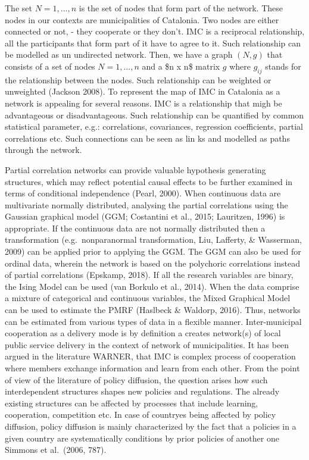 \documentclass[
  letterpaper,
  DIV=11,
  numbers=noendperiod]{scrartcl}
\begin{document}
The set \(N = {1, ..., n}\) is the set of nodes that form part of the
network. These nodes in our contexts are municipalities of Catalonia.
Two nodes are either connected or not, - they cooperate or they don't.
IMC is a reciprocal relationship, all the participants that form part of
it have to agree to it. Such relationship can be modelled as un
undirected network. Then, we have a graph \((N, g)\) that consists of a
set of nodes \(N = {1, ..., n}\) and a \$n x n\$ matrix \(g\) where
\(g_{ij}\) stands for the relationship between the nodes. Such
relationship can be weighted or unweighted (Jackson 2008). To represent
the map of IMC in Catalonia as a network is appealing for several
reasons. IMC is a relationship that migh be advantageous or
disadvantageous. Such relationship can be quantified by common
statistical parameter, e.g.: correlations, covariances, regression
coefficients, partial correlations etc. Such connections can be seen as
lin ks and modelled as paths through the network.

Partial correlation networks can provide valuable hypothesis generating
structures, which may reflect potential causal effects to be further
examined in terms of conditional independence (Pearl, 2000). When
continuous data are multivariate normally distributed, analysing the
partial correlations using the Gaussian graphical model (GGM; Costantini
et al., 2015; Lauritzen, 1996) is appropriate. If the continuous data
are not normally distributed then a transformation (e.g.~nonparanormal
transformation, Liu, Lafferty, \& Wasserman, 2009) can be applied prior
to applying the GGM. The GGM can also be used for ordinal data, wherein
the network is based on the polychoric correlations instead of partial
correlations (Epskamp, 2018). If all the research variables are binary,
the Ising Model can be used (van Borkulo et al., 2014). When the data
comprise a mixture of categorical and continuous variables, the Mixed
Graphical Model can be used to estimate the PMRF (Haslbeck \& Waldorp,
2016). Thus, networks can be estimated from various types of data in a
flexible manner. Inter-municipal cooperation as a delivery mode is by
definition a creates network(s) of local public service delivery in the
context of network of municipalities. It has been argued in the
literature WARNER, that IMC is complex process of cooperation where
members exchange information and learn from each other. From the point
of view of the literature of policy diffusion, the question arises how
such interdependent structures shapes new policies and regulations. The
already existing structures can be affected by processes that include
learning, cooperation, competition etc. In case of countryes being
affected by policy diffusion, policy diffusion is mainly characterized
by the fact that a policies in a given country are systematically
conditions by prior policies of another one Simmons et al.~(2006, 787).
\end{document}
